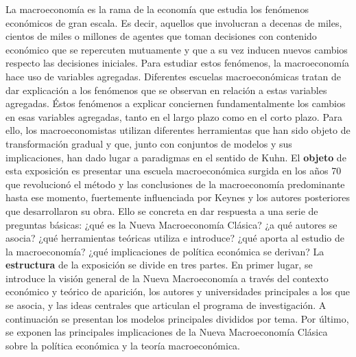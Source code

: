 \documentclass{nuevotema}
\begin{document}
\ideaclave

La macroeconomía es la rama de la economía que estudia los fenómenos económicos de gran escala. Es decir, aquellos que involucran a decenas de miles, cientos de miles o millones de agentes que toman decisiones con contenido económico que se repercuten mutuamente y que a su vez inducen nuevos cambios respecto las decisiones iniciales. Para estudiar estos fenómenos, la macroeconomía hace uso de variables agregadas. Diferentes escuelas macroeconómicas tratan de dar explicación a los fenómenos que se observan en relación a estas variables agregadas. Éstos fenómenos a explicar conciernen fundamentalmente los cambios en esas variables agregadas, tanto en el largo plazo como en el corto plazo. Para ello, los macroeconomistas utilizan diferentes herramientas que han sido objeto de transformación gradual y que, junto con conjuntos de modelos y sus implicaciones, han dado lugar a paradigmas en el sentido de Kuhn. El \textbf{objeto} de esta exposición es presentar una escuela macroeconómica surgida en los años 70 que revolucionó el método y las conclusiones de la macroeconomía predominante hasta ese momento, fuertemente influenciada por Keynes y los autores posteriores que desarrollaron su obra. Ello se concreta en dar respuesta a una serie de preguntas básicas: ¿qué es la Nueva Macroeconomía Clásica? ¿a qué autores se asocia? ¿qué herramientas teóricas utiliza e introduce? ¿qué aporta al estudio de la macroeconomía? ¿qué implicaciones de política económica se derivan? La \textbf{estructura} de la exposición se divide en tres partes. En primer lugar, se introduce la visión general de la Nueva Macroeconomía a través del contexto económico y teórico de aparición, los autores y universidades principales a los que se asocia, y las ideas centrales que articulan el programa de investigación. A continuación se presentan los modelos principales divididos por tema. Por último, se exponen las principales implicaciones de la Nueva Macroeconomía Clásica sobre la política económica y la teoría macroeconómica.
\end{document}
